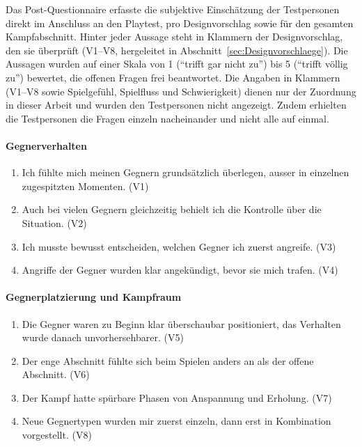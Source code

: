 \documentclass[../Main.tex]{subfiles}
\begin{document}
Das Post-Questionnaire erfasste die subjektive Einschätzung der Testpersonen direkt im Anschluss an den Playtest, pro Designvorschlag sowie für den gesamten Kampfabschnitt. Hinter jeder Aussage steht in Klammern der Designvorschlag, den sie überprüft (V1--V8, hergeleitet in Abschnitt~\ref{sec:Designvorschlaege}). Die Aussagen wurden auf einer Skala von 1 (\enquote{trifft gar nicht zu}) bis 5 (\enquote{trifft völlig zu}) bewertet, die offenen Fragen frei beantwortet. Die Angaben in Klammern (V1--V8 sowie Spielgefühl, Spielfluss und Schwierigkeit) dienen nur der Zuordnung in dieser Arbeit und wurden den Testpersonen nicht angezeigt. Zudem erhielten die Testpersonen die Fragen einzeln nacheinander und nicht alle auf einmal.

\paragraph{Gegnerverhalten}
\begin{enumerate}[label=\textbf{Q\arabic*}, leftmargin=1.5cm, itemsep=0.5em]
    \item Ich fühlte mich meinen Gegnern grundsätzlich überlegen, ausser in einzelnen zugespitzten Momenten. \hfill (V1)
    \item Auch bei vielen Gegnern gleichzeitig behielt ich die Kontrolle über die Situation. \hfill (V2)
    \item Ich musste bewusst entscheiden, welchen Gegner ich zuerst angreife. \hfill (V3)
    \item Angriffe der Gegner wurden klar angekündigt, bevor sie mich trafen. \hfill (V4)
\end{enumerate}

\paragraph{Gegnerplatzierung und Kampfraum}
\begin{enumerate}[label=\textbf{Q\arabic*}, leftmargin=1.5cm, itemsep=0.5em, resume]
    \item Die Gegner waren zu Beginn klar überschaubar positioniert, das Verhalten wurde danach unvorhersehbarer. \hfill (V5)
    \item Der enge Abschnitt fühlte sich beim Spielen anders an als der offene Abschnitt. \hfill (V6)
    \item Der Kampf hatte spürbare Phasen von Anspannung und Erholung. \hfill (V7)
    \item Neue Gegnertypen wurden mir zuerst einzeln, dann erst in Kombination vorgestellt. \hfill (V8)
\end{enumerate}
\end{document}
